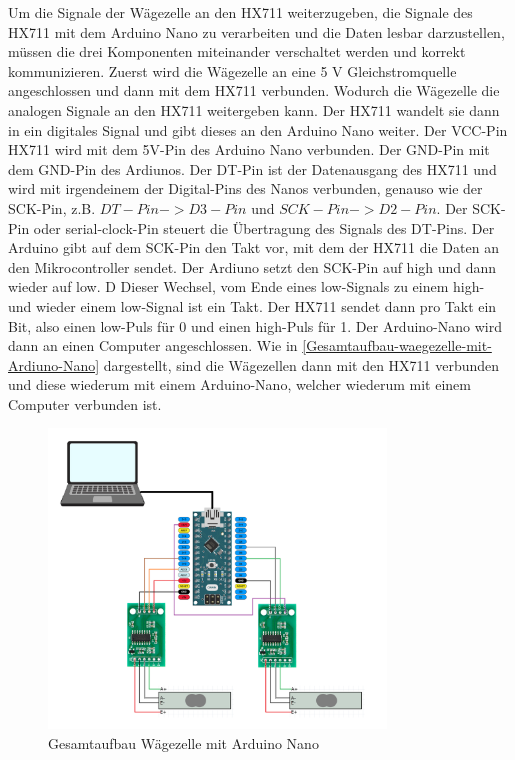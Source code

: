 Um die Signale der Wägezelle an den HX711 weiterzugeben, die Signale des HX711 mit dem Arduino Nano zu verarbeiten und die Daten lesbar darzustellen, müssen die drei Komponenten miteinander verschaltet werden und korrekt kommunizieren.
Zuerst wird die Wägezelle an eine 5 V Gleichstromquelle angeschlossen und dann mit dem HX711 verbunden.
Wodurch die Wägezelle die analogen Signale an den HX711 weitergeben kann.
Der HX711 wandelt sie dann in ein digitales Signal und gibt dieses an den Arduino Nano weiter.
Der VCC-Pin HX711 wird mit dem 5V-Pin des Arduino Nano verbunden.
Der GND-Pin mit dem GND-Pin des Ardiunos.
Der DT-Pin ist der Datenausgang des HX711 und wird mit irgendeinem der Digital-Pins des Nanos verbunden, genauso wie der SCK-Pin, z.B. $DT-Pin -> D3-Pin$ und $SCK-Pin -> D2-Pin$.
 Der SCK-Pin oder serial-clock-Pin steuert die Übertragung des Signals des DT-Pins.
 Der Arduino gibt auf dem SCK-Pin den Takt vor, mit dem der HX711 die Daten an den Mikrocontroller sendet.
 Der Ardiuno setzt den SCK-Pin auf high und dann wieder auf low. D
 Dieser Wechsel, vom Ende eines low-Signals zu einem high- und wieder einem low-Signal ist ein Takt.
 Der HX711 sendet dann pro Takt ein Bit, also einen low-Puls für 0 und einen high-Puls für 1.
Der Arduino-Nano wird dann an einen Computer angeschlossen. Wie in \autoref{Gesamtaufbau-waegezelle-mit-Ardiuno-Nano} dargestellt, sind die Wägezellen dann mit den HX711 verbunden und diese wiederum mit einem Arduino-Nano, welcher wiederum mit einem Computer verbunden ist.
\begin{figure}[h!]
    \centering
    \includegraphics[width=0.8\textwidth]{img/Schaltungs-Aufbau.png}
    \caption{Gesamtaufbau Wägezelle mit Arduino Nano}
    \label{Gesamtaufbau-waegezelle-mit-Arduino-Nano}
\end{figure}
